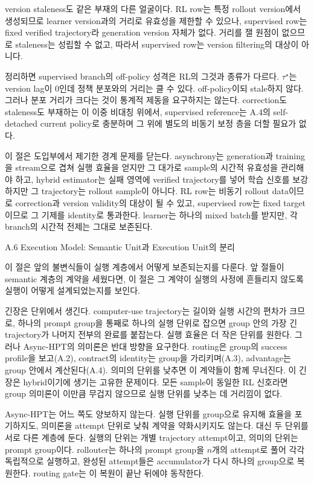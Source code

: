 version staleness도 같은 부재의 다른 얼굴이다. RL row는 특정 rollout version에서 생성되므로 learner version과의 거리로 유효성을 제한할 수 있으나, supervised row는 fixed verified trajectory라 generation version 자체가 없다. 거리를 잴 원점이 없으므로 staleness는 성립할 수 없고, 따라서 supervised row는 version filtering의 대상이 아니다.

정리하면 supervised branch의 off-policy 성격은 RL의 그것과 종류가 다르다. $\tau^\star$는 version lag이 $0$인데 정책 분포와의 거리는 클 수 있다. off-policy이되 stale하지 않다. 그러나 분포 거리가 크다는 것이 통계적 제동을 요구하지는 않는다. correction도 staleness도 부재하는 이 이중 비대칭 위에서, supervised reference는 A.4의 self-detached current policy로 충분하며 그 위에 별도의 비동기 보정 층을 더할 필요가 없다.

이 절은 도입부에서 제기한 경계 문제를 닫는다. asynchrony는 generation과 training을 stream으로 겹쳐 실행 효율을 얻지만 그 대가로 sample의 시간적 유효성을 관리해야 하고, hybrid estimator는 실패 영역에 verified trajectory를 넣어 학습 신호를 보강하지만 그 trajectory는 rollout sample이 아니다. RL row는 비동기 rollout data이므로 correction과 version validity의 대상이 될 수 있고, supervised row는 fixed target이므로 그 기제를 identity로 통과한다. learner는 하나의 mixed batch를 받지만, 각 branch의 시간적 전제는 그대로 보존된다.

A.6 Execution Model: Semantic Unit과 Execution Unit의 분리

이 절은 앞의 불변식들이 실행 계층에서 어떻게 보존되는지를 다룬다. 앞 절들이 semantic 계층의 계약을 세웠다면, 이 절은 그 계약이 실행의 사정에 흔들리지 않도록 실행이 어떻게 설계되었는지를 보인다.

긴장은 단위에서 생긴다. computer-use trajectory는 길이와 실행 시간의 편차가 크므로, 하나의 prompt group을 통째로 하나의 실행 단위로 잡으면 group 안의 가장 긴 trajectory가 나머지 전부의 완료를 붙잡는다. 실행 효율은 더 작은 단위를 원한다. 그러나 Async-HPT의 의미론은 반대 방향을 요구한다. routing은 group의 success profile을 보고(A.2), contract의 identity는 group을 가리키며(A.3), advantage는 group 안에서 계산된다(A.4). 의미의 단위를 낮추면 이 계약들이 함께 무너진다. 이 긴장은 hybrid이기에 생기는 고유한 문제이다. 모든 sample이 동일한 RL 신호라면 group 의미론이 이만큼 무겁지 않으므로 실행 단위를 낮추는 데 거리낌이 없다.

Async-HPT는 어느 쪽도 양보하지 않는다. 실행 단위를 group으로 유지해 효율을 포기하지도, 의미론을 attempt 단위로 낮춰 계약을 약화시키지도 않는다. 대신 두 단위를 서로 다른 계층에 둔다. 실행의 단위는 개별 trajectory attempt이고, 의미의 단위는 prompt group이다. rollouter는 하나의 prompt group을 $n$개의 attempt로 풀어 각각 독립적으로 실행하고, 완성된 attempt들은 accumulator가 다시 하나의 group으로 복원한다. routing gate는 이 복원이 끝난 뒤에야 동작한다.

